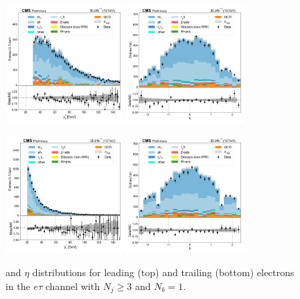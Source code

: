 \begin{figure}[htb!]
    \centering
    \includegraphics[width=0.4\textwidth]{chapters/Appendix/sectionPlots/figures/data_mc_overlays/etau_2016_cat_gt3_eq1_signal_linear_lepton_lepton1_pt}
    \includegraphics[width=0.4\textwidth]{chapters/Appendix/sectionPlots/figures/data_mc_overlays/etau_2016_cat_gt3_eq1_signal_linear_lepton_lepton1_eta}

    \includegraphics[width=0.4\textwidth]{chapters/Appendix/sectionPlots/figures/data_mc_overlays/etau_2016_cat_gt3_eq1_signal_linear_lepton_lepton2_pt}
    \includegraphics[width=0.4\textwidth]{chapters/Appendix/sectionPlots/figures/data_mc_overlays/etau_2016_cat_gt3_eq1_signal_linear_lepton_lepton2_eta}
    \caption{\pt and $\eta$ distributions for leading (top) and trailing
        (bottom) electrons in the $e\tau$ channel with $N_{j} \geq 3$ and
        $N_{b} = 1$.}
    \label{fig:etau_7_kinematic}
\end{figure}


